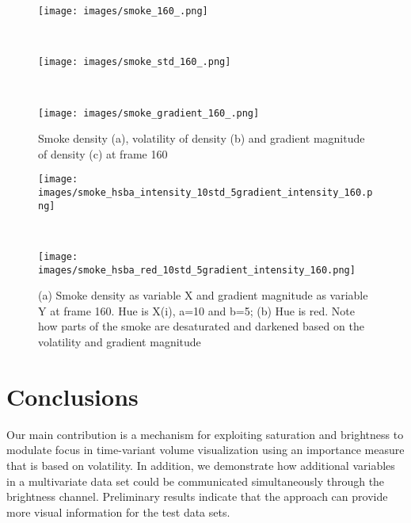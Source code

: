 \begin{figure}
\centering
\begin{minipage}{.33\textwidth}
\texttt{[image: images/smoke\_160\_.png]}
\subcaption{}
\end{minipage}~
\begin{minipage}{.33\textwidth}
\texttt{[image: images/smoke\_std\_160\_.png]}
\subcaption{}
\end{minipage}~
\begin{minipage}{.33\textwidth}
\texttt{[image: images/smoke\_gradient\_160\_.png]}
\subcaption{}
\end{minipage}
\caption{Smoke density (a), volatility of density (b) and gradient magnitude of density (c) at frame 160}
\label{fig:smoke_gray}
\end{figure}

\begin{figure}
\centering
\begin{minipage}{.33\textwidth}
\texttt{[image: images/smoke\_hsba\_intensity\_10std\_5gradient\_intensity\_160.png]}
\subcaption{}
\end{minipage}~
\begin{minipage}{.33\textwidth}
\texttt{[image: images/smoke\_hsba\_red\_10std\_5gradient\_intensity\_160.png]}
\subcaption{}
\end{minipage}
\caption{(a) Smoke density as variable X and gradient magnitude as variable Y at frame 160. Hue is X(i), a=10 and b=5; (b) Hue is red. Note how parts of the smoke are desaturated and darkened based on the volatility and gradient magnitude}
\label{fig:smoke_hsba}
\end{figure}

\section{Conclusions}
Our main contribution is a mechanism for exploiting saturation and brightness to modulate focus in time-variant volume visualization using an importance measure that is based on volatility. In addition, we demonstrate how additional variables in a multivariate data set could be communicated simultaneously through the brightness channel. Preliminary results indicate that the approach can provide more visual information for the test data sets.

